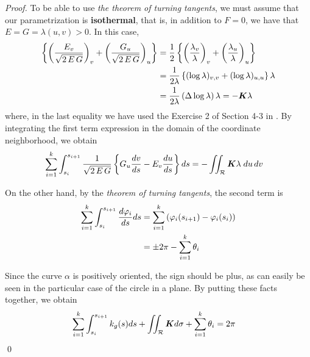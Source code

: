 \documentclass[11pt]{article}
\begin{document}
\begin{itemize}
\begin{proof}
To be able to use \emph{the theorem of turning tangents}, we must assume that our parametrization is \textbf{isothermal}, that is, in addition to $F = 0$, we have that $E = G = \lambda(u, v) > 0$. In this case, 
\begin{align}
\left\{\left(\frac{E_{v}}{\sqrt{2\,E\,G}}\right)_{v} + \left(\frac{G_{u}}{\sqrt{2\,E\,G}}\right)_{u} \right\} &= \frac{1}{2}\left\{\left(\frac{\lambda_{v}}{\lambda}\right)_{v} + \left(\frac{\lambda_{u}}{\lambda}\right)_{u}\right\} \nonumber\\
&= \frac{1}{2\lambda}\left\{(\log \lambda)_{v,v} + (\log \lambda)_{u,u}\right\}\lambda \nonumber\\
&= \frac{1}{2\lambda}\left(\Delta \log \lambda\right)\lambda = -\boldsymbol{K}\lambda \label{eqn: gauss_bonnet_first_term}
\end{align} where, in the last equality we have used the Exercise 2 of Section 4-3 in \citep{do1976differential}. By integrating the first term expression in the domain of the coordinate neighborhood, we obtain
\begin{align*}
\sum_{i=1}^{k}\int_{s_{i}}^{s_{i+1}}\frac{1}{\sqrt{2\,E\,G}}\left\{G_{u}\frac{dv}{ds} - E_{v}\frac{du}{ds} \right\}ds &= - \iint_{{\mathcal R}}\boldsymbol{K}\lambda \;du\,dv
\end{align*}

On the other hand, by the \emph{theorem of turning tangents}, the second term is
\begin{align*}
\sum_{i=1}^{k}\int_{s_{i}}^{s_{i+1}}\frac{d\varphi_{i}}{ds}ds &= \sum_{i=1}^{k}\left(\varphi_{i}(s_{i+1}) - \varphi_{i}(s_{i})\right)\\
&= \pm 2\pi - \sum_{i=1}^{k}\theta_i
\end{align*}

Since the curve $\alpha$ is positively oriented, the sign should be plus, as can easily be seen in the particular case of the circle in a plane. By putting these facts together, we obtain
\begin{align*}
\sum_{i=1}^{k}\int_{s_{i}}^{s_{i+1}}k_{g}(s)ds + \iint_{{\mathcal R}}\boldsymbol{K}d\sigma + \sum_{i=1}^{k}\theta_{i} &= 2\pi
\end{align*}\qed
\end{proof}


\end{itemize}
\end{document}
